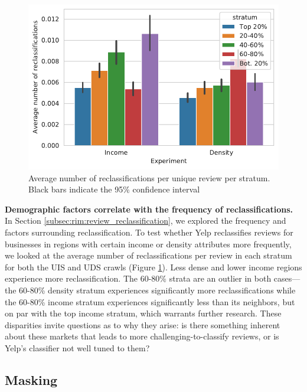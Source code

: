 \begin{figure}[t]
    \centering
    \includegraphics[width=0.9\columnwidth]{chapters/reviews/figures/stratified_reclass_swaps_usa.pdf}
    \caption[Average number of reclassifications per unique review per stratum]{Average number of reclassifications per unique review per stratum. Black bars indicate the 95\% confidence interval}
    \label{fig:stratified_reclass_swaps_usa}
\end{figure}

\textbf{Demographic factors correlate with the frequency of reclassifications.} In Section \ref{subsec:rim:review_reclassification}, we explored the frequency and factors surrounding reclassification. To test whether Yelp reclassifies reviews for businesses in regions with certain income or density attributes more frequently, we looked at the average number of reclassifications per review in each stratum for both the UIS and UDS crawls (Figure \ref{fig:stratified_reclass_swaps_usa}). Less dense and lower income regions experience more reclassification. The 60-80\% strata are an outlier in both cases---the 60-80\% density stratum experiences significantly more reclassifications while the 60-80\% income stratum experiences significantly less than its neighbors, but on par with the top income stratum, which warrants further research. These disparities invite questions as to why they arise: is there something inherent about these markets that leads to more challenging-to-classify reviews, or is Yelp's classifier not well tuned to them?



\subsection{Masking}

